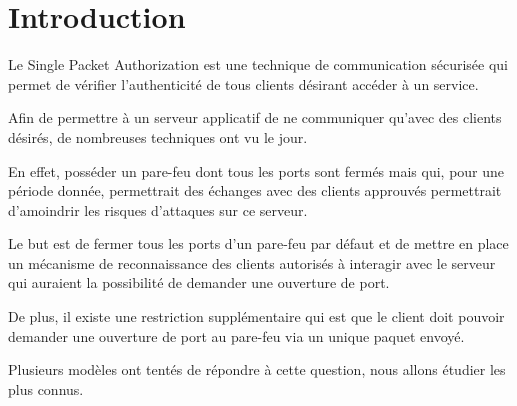 \chapter*{Introduction}

Le Single Packet Authorization est une technique de communication sécurisée qui permet de vérifier l'authenticité de tous clients désirant accéder à un service.

Afin de permettre à un serveur applicatif de ne communiquer qu'avec des clients désirés, de nombreuses techniques ont vu le jour. 

En effet, posséder un pare-feu dont tous les ports sont fermés mais qui, pour une période donnée, permettrait des échanges avec des clients approuvés permettrait d'amoindrir les risques d'attaques sur ce serveur.

Le but est de fermer tous les ports d'un pare-feu par défaut et de mettre en place un mécanisme de reconnaissance des clients autorisés à interagir avec le serveur qui auraient la possibilité de demander une ouverture de port.

De plus, il existe une restriction supplémentaire qui est que le client doit pouvoir demander une ouverture de port au pare-feu via un unique paquet envoyé.

Plusieurs modèles ont tentés de répondre à cette question, nous allons étudier les plus connus.
